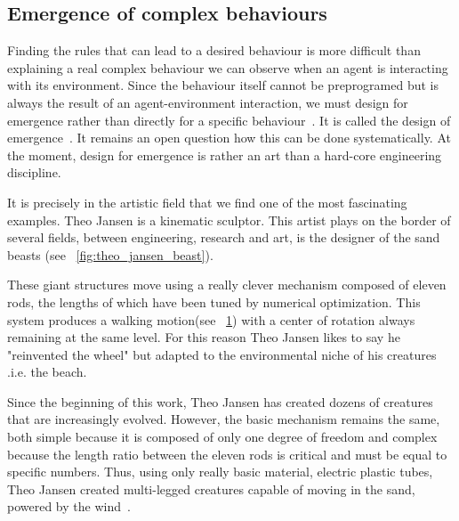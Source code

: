 \subsection{Emergence of complex behaviours} %

Finding the rules that can lead to a desired behaviour is more difficult than explaining a real complex behaviour we can observe when an agent is interacting with its environment. Since the behaviour itself cannot be preprogramed but is always the result of an agent-environment interaction, we must design for emergence rather than directly for a specific behaviour~\parencite{Pfeifer06}. It is called the design of emergence~\parencite{Steels1991emergence}. It remains an open question how this can be done systematically. At the moment, design for emergence is rather an art than a hard-core engineering discipline.

It is precisely in the artistic field that we find one of the most fascinating examples. Theo Jansen is a kinematic sculptor. This artist plays on the border of several fields, between engineering, research and art, is the designer of the sand beasts (see \figurename~\ref{fig:theo_jansen_beast}).

\begin{figure}[tb]
\centering
    \newline
    \hfil
    \hfil
    \caption{}
    \label{fig:beast_mechanism}
\end{figure}


These giant structures move using a really clever mechanism composed of eleven rods, the lengths of which have been tuned by numerical optimization. This system produces a walking motion(see \figurename~\ref{fig:beast_mechanism}) with a center of rotation always remaining at the same level. For this reason Theo Jansen likes to say he "reinvented the wheel" but adapted to the environmental niche of his creatures .i.e. the beach.

Since the beginning of this work, Theo Jansen has created dozens of creatures that are increasingly evolved. However, the basic mechanism remains the same, both simple because it is composed of only one degree of freedom and complex because the length ratio between the eleven rods is critical and must be equal to specific numbers. Thus, using only really basic material, electric plastic tubes, Theo Jansen created multi-legged creatures capable of moving in the sand, powered by the wind~\parencite{jansen2007theo}.




